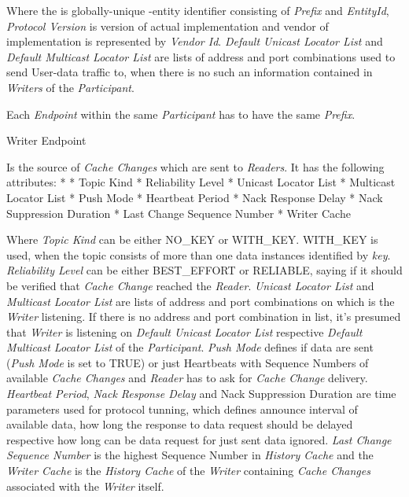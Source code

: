 Where the {\em {}} is globally-unique -entity identifier consisting of {\em {} Prefix} and {\em EntityId}, {\em Protocol Version} is version of actual implementation and vendor of implementation is represented by {\em Vendor Id}. {\em Default Unicast Locator List} and {\em Default Multicast Locator List} are lists of  address and port combinations used to send User-data traffic to, when there is no such an information contained in {\em Writers} of the {\em Participant}.

Each {\em Endpoint} within the same {\em Participant} has to have the same {\em {} Prefix}.

\secc Writer Endpoint

Is the source of {\em Cache Changes} which are sent to {\em Readers}. It has the following attributes:
\begitems
* 
* Topic Kind
* Reliability Level
* Unicast Locator List
* Multicast Locator List
* Push Mode
* Heartbeat Period
* Nack Response Delay
* Nack Suppression Duration
* Last Change Sequence Number
* Writer Cache
\enditems

Where {\em Topic Kind} can be either NO\_KEY or WITH\_KEY. WITH\_KEY is used, when the topic consists of more than one data instances identified by {\em key}. {\em Reliability Level} can be either BEST\_EFFORT or RELIABLE, saying if it should be verified that {\em Cache Change} reached the {\em Reader}. {\em Unicast Locator List} and {\em Multicast Locator List} are lists of  address and port combinations on which is the {\em Writer} listening. If there is no  address and port combination in list, it's presumed that {\em Writer} is listening on {\em Default Unicast Locator List} respective {\em Default Multicast Locator List} of the {\em Participant}. {\em Push Mode} defines if data are sent ({\em Push Mode} is set to TRUE) or just Heartbeats with Sequence Numbers of available {\em Cache Changes} and {\em Reader} has to ask for {\em Cache Change} delivery. {\em Heartbeat Period}, {\em Nack Response Delay} and {Nack Suppression Duration} are time parameters used for protocol tunning, which defines announce interval of available data, how long the response to data request should be delayed respective how long can be data request for just sent data ignored. {\em Last Change Sequence Number} is the highest Sequence Number in {\em History Cache} and the {\em Writer Cache} is the {\em History Cache} of the {\em Writer} containing {\em Cache Changes} associated with the {\em Writer} itself.

